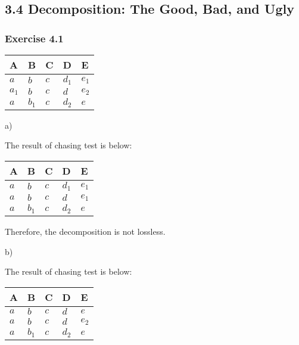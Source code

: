 \documentclass[../../main.tex]{subfiles}
\begin{document}
\subsection{3.4 Decomposition: The Good, Bad, and Ugly}

\subsubsection*{Exercise 4.1}

\begin{table}[H]
  \centering
  \begin{tabular}{@{}lllll@{}}
  \toprule
  A & B & C & D & E \\ \midrule
  $a$     & $b$      & $c$ & $d_{1}$ & $e_{1}$  \\
  $a_{1}$ & $b$      & $c$ & $d$     & $e_{2}$  \\
  $a$     & $b_{1}$  & $c$ & $d_{2}$ & $e$      \\ \bottomrule
  \end{tabular}
\end{table}

a)

The result of chasing test is below:

\begin{table}[H]
  \centering
  \begin{tabular}{@{}lllll@{}}
  \toprule
  A & B & C & D & E \\ \midrule
  $a$ & $b$      & $c$ & $d_{1}$ & $e_{1}$  \\
  $a$ & $b$      & $c$ & $d$     & $e_{1}$  \\
  $a$ & $b_{1}$  & $c$ & $d_{2}$ & $e$      \\ \bottomrule
  \end{tabular}
\end{table}

Therefore, the decomposition is not lossless.

b)

The result of chasing test is below:

\begin{table}[H]
  \centering
  \begin{tabular}{@{}lllll@{}}
  \toprule
  A & B & C & D & E \\ \midrule
  $a$ & $b$      & $c$ & $d$     & $e$  \\
  $a$ & $b$      & $c$ & $d$     & $e_{2}$  \\
  $a$ & $b_{1}$  & $c$ & $d_{2}$ & $e$      \\ \bottomrule
  \end{tabular}
\end{table}
\end{document}
